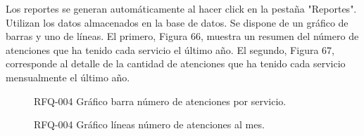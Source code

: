 Los reportes se generan automáticamente al hacer click en la pestaña "Reportes". Utilizan los datos almacenados en la base de datos. Se dispone de un gráfico de barras y uno de líneas. El primero, Figura 66, muestra un resumen del número de atenciones que ha tenido cada servicio el último año. El segundo, Figura 67, corresponde al detalle de la cantidad de atenciones que ha tenido cada servicio mensualmente el último año.

\begin{figure}[H]
\centering
\setlength\fboxsep{0pt}
\setlength\fboxrule{0.5pt}
\caption{RFQ-004 Gráfico barra número de atenciones por servicio.}
\label{rfq004}
\end{figure}

\begin{figure}[H]
\centering
\setlength\fboxsep{0pt}
\setlength\fboxrule{0.5pt}
\caption{RFQ-004 Gráfico líneas número de atenciones al mes.}
\label{rfq004}
\end{figure}

